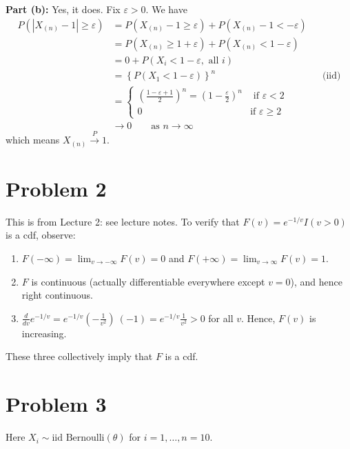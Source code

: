 \documentclass[
]{article}
\begin{document}
\textbf{Part (b):} Yes, it does. Fix \(\varepsilon> 0\). We have \[
\begin{aligned}
P(|X_{(n)} - 1| \geq \varepsilon) &= P(X_{(n)} - 1 \geq \varepsilon) + P(X_{(n)} - 1 < -\varepsilon) \\
&=  P(X_{(n)} \geq 1 + \varepsilon) + P(X_{(n)}  < 1 -\varepsilon) \\
&= 0 + P(X_i < 1 -\varepsilon, \text{ all } i) \\
&= \left\{P(X_1 < 1-\varepsilon)\right\}^n && \text{(iid)} \\
&= \begin{cases}
\left(\frac{1-\varepsilon+1}{2}\right)^n = \left(1- \frac{\varepsilon}{2}\right)^n & \text{ if } \varepsilon< 2 \\
0 & \text{if } \varepsilon\geq 2
\end{cases} \\
&\to  0 \qquad \text{as } {n \to \infty}
\end{aligned}
\] which means \(X_{(n)} \xrightarrow{P} 1\).

\hypertarget{problem-2}{%
\section{Problem 2}\label{problem-2}}

This is from Lecture 2: see lecture notes. To verify that
\(F(v) = e^{-1/v} I(v > 0)\) is a cdf, observe:

\begin{enumerate}
\def\labelenumi{(\roman{enumi})}
\item
  \(F(-\infty) = \lim_{v \to -\infty} F(v) = 0\) and
  \(F(+\infty) = \lim_{v \to \infty} F(v) = 1\).
\item
  \(F\) is continuous (actually differentiable everywhere except
  \(v = 0\)), and hence right continuous.
\item
  \(\displaystyle\frac{d}{dv} e^{-1/v} = e^{-1/v} \left( - \frac{1}{v^2}\right) \ (-1) = e^{-1/v} \frac{1}{v^2} > 0\)
  for all \(v\). Hence, \(F(v)\) is increasing.
\end{enumerate}

These three collectively imply that \(F\) is a cdf.

\hypertarget{problem-3}{%
\section{Problem 3}\label{problem-3}}

Here \(X_i \sim \text{iid~Bernoulli}(\theta)\) for
\(i = 1, \dots, n=10\).
\end{document}
